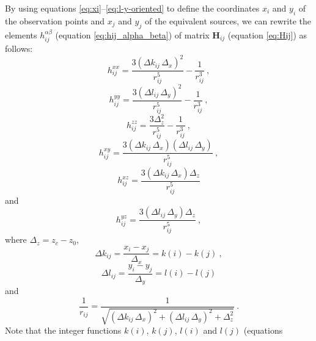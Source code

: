 \documentclass[manuscript]{geophysics}
\begin{document}
	By using equations \ref{eq:xi}--\ref{eq:l-y-oriented} to define the coordinates $x_{i}$ and 
	$y_{i}$ of the observation points and $x_{j}$ and $y_{j}$ of the equivalent sources, we can
	rewrite the elements $h^{\alpha\beta}_{ij}$ (equation \ref{eq:hij_alpha_beta}) of matrix 
	$\mathbf{H}_{ij}$ (equation \ref{eq:Hij}) as follows:
	\begin{equation}
		h^{xx}_{ij} = 
		\frac{3 \left( \Delta k_{ij} \, \Delta_{x} \right)^{2}}{r_{ij}^{5}} - \frac{1}{r_{ij}^{3}} \: ,
		\label{eq:hxx_regular}
	\end{equation}
	\begin{equation}
		h^{yy}_{ij} = 
		\frac{3 \left( \Delta l_{ij} \, \Delta_{y} \right)^{2}}{r_{ij}^{5}} - \frac{1}{r_{ij}^{3}} \: ,
		\label{eq:hyy_regular}
	\end{equation}
	\begin{equation}
		h^{zz}_{ij} = 
		\frac{3 \Delta_{z}^{2}}{r_{ij}^{5}} - \frac{1}{r_{ij}^{3}} \: ,
		\label{eq:hzz_regular}
	\end{equation}
	\begin{equation}
		h^{xy}_{ij} = 
		\frac{3 \left( \Delta k_{ij} \, \Delta_{x} \right)\left( \Delta l_{ij} \, \Delta_{y} \right)}{r_{ij}^{5}} \: ,
		\label{eq:hxy_regular}
	\end{equation}
	\begin{equation}
		h^{xz}_{ij} = 
		\frac{3 \left( \Delta k_{ij} \, \Delta_{x} \right) \Delta_{z}}{r_{ij}^{5}}
		\label{eq:hxz_regular}
	\end{equation}
	and
	\begin{equation}
		h^{yz}_{ij} = 
		\frac{3 \left( \Delta l_{ij} \, \Delta_{y} \right) \Delta_{z}}{r_{ij}^{5}} \: ,
		\label{eq:hyz_regular}
	\end{equation}
	where $\Delta_{z} = z_{c} - z_{0}$, 
	\begin{equation}
		\Delta k_{ij} = \frac{x_{i} - x_{j}}{\Delta_{x}} = k(i) - k(j) \: ,
		\label{eq:Delta_kij}
	\end{equation}
	\begin{equation}
		\Delta l_{ij} = \frac{y_{i} - y_{j}}{\Delta_{y}} = l(i) - l(j)
		\label{eq:Delta_lij}
	\end{equation}
	and 
	\begin{equation}
		\frac{1}{r_{ij}} = 
		\frac{1}{\sqrt{\left( \Delta k_{ij} \, \Delta_{x} \right)^{2} + \left( \Delta l_{ij} \, \Delta_{y} \right)^{2} + \Delta_{z}^{2}}} \: .
		\label{eq:1_rij_regular}
	\end{equation}
	Note that the integer functions $k(i)$, $k(j)$, $l(i)$ and $l(j)$ (equations 
\end{document}
